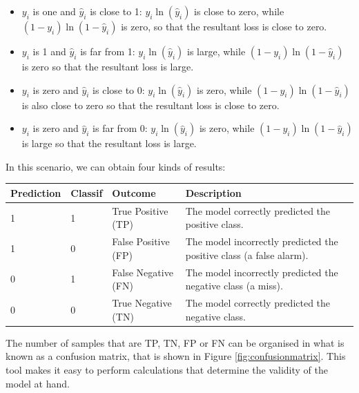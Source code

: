 		\begin{itemize}
			\item $y_i$ is one and $\hat{y}_i$ is close to 1: $y_i \ln(\hat{y}_i)$ is close to zero, while $(1 - y_i) \ln(1 - \hat{y}_i)$ is zero, so that the resultant loss is close to zero.
			\item $y_i$ is 1 and $\hat{y}_i$ is far from 1: $y_i \ln(\hat{y}_i)$ is large, while $(1 - y_i) \ln(1 - \hat{y}_i)$ is zero so that the resultant loss is large.
			\item $y_i$ is zero and $\hat{y}_i$ is close to 0: $y_i \ln(\hat{y}_i)$ is zero, while $(1 - y_i) \ln(1 - \hat{y}_i)$ is also close to zero so that the resultant loss is close to zero.
			\item $y_i$ is zero and $\hat{y}_i$ is far from 0: $y_i \ln(\hat{y}_i)$ is zero, while $(1 - y_i) \ln(1 - \hat{y}_i)$ is large so that the resultant loss is large.
		\end{itemize}
		\bigskip
		
		In this scenario,  we can obtain four kinds of results:
		
		\begin{table}[!ht]
			\centering
			\begin{tabular}{|l|l|l|p{2cm}|}
				\hline
				Prediction & Classif & Outcome & Description \\ \hline\hline
				1 & 1 & True Positive (TP) & The model correctly predicted the positive class. \\ \hline
				1 & 0 & False Positive (FP) & The model incorrectly predicted the positive class (a false alarm). \\ \hline
				0 & 1 & False Negative (FN) & The model incorrectly predicted the negative class (a miss). \\ \hline
				0 & 0 & True Negative (TN) & The model correctly predicted the negative class. \\ \hline
			\end{tabular}
		\end{table}
		
		The number of samples that are TP, TN, FP or FN can be organised in what is known as a confusion matrix, that is shown in Figure \ref{fig:confusionmatrix}. This tool makes it easy to perform calculations that determine the validity of the model at hand.
		
